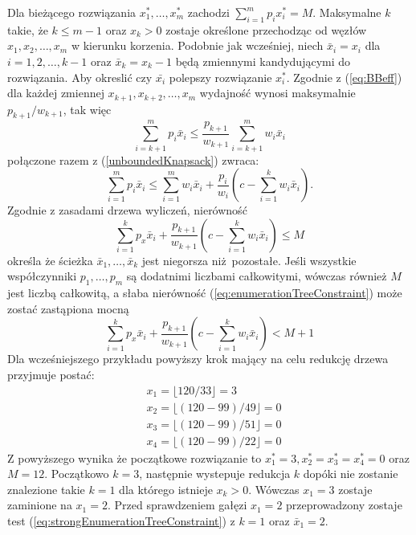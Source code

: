Dla bieżącego rozwiązania $x_1^*,\dots,x_m^*$ zachodzi $\sum_{i=1}^m p_ix_i^* = M$. Maksymalne $k$ takie, że $ k \le m - 1$ oraz $x_k > 0$ zostaje określone przechodząc od węzłów $x_1,x_2,\dots,x_m$ w kierunku korzenia. Podobnie jak wcześniej, niech $\bar{x}_i = x_i$ dla $i=1,2,\dots,k-1$ oraz $\bar{x}_k = x_k -1$ będą zmiennymi kandydującymi do rozwiązania. Aby okreslić czy $\bar{x_i}$ polepszy rozwiązanie $x_i^*$. Zgodnie z (\ref{eq:BBeff}) dla każdej zmiennej $x_{k+1}, x_{k+2}, \dots, x_m$ wydajność wynosi maksymalnie $p_{k+1}/w_{k+1}$, tak więc
\begin{equation*}
  \sum_{i=k+1}^m p_i\bar{x}_i \le \frac{p_{k+1}}{w_{k+1}}\sum_{i=k+1}^m w_i \bar{x}_i
\end{equation*}
połączone razem z (\ref{unboundedKnapsack}) zwraca:
\begin{equation}
  \sum_{i=1}^m p_i\bar{x}_i \le \sum_{i=1}^m w_i \bar{x}_i + \frac{p_i}{w_{i}}( c - \sum_{i=1}^k w_i\bar{x}_i ).
\end{equation}
Zgodnie z zasadami drzewa wyliczeń, nierówność
\begin{equation} \label{eq:enumerationTreeConstraint}
  \sum_{i=1}^k p_x\bar{x}_i + \frac{p_{k+1}}{w_{k+1}}(c - \sum_{i=1}^kw_i\bar{x}_i) \le M
\end{equation}
określa że ścieżka $\bar{x}_1, \dots, \bar{x}_k$ jest niegorsza niż pozostałe. Jeśli wszystkie współczynniki $p_1,\dots,p_m$ są dodatnimi liczbami całkowitymi, wówczas również $M$ jest liczbą całkowitą, a słaba nierówność (\ref{eq:enumerationTreeConstraint}) może zostać zastąpiona mocną
\begin{equation} \label{eq:strongEnumerationTreeConstraint}
  \sum_{i=1}^k p_x\bar{x}_i + \frac{p_{k+1}}{w_{k+1}}(c - \sum_{i=1}^kw_i\bar{x}_i) < M + 1
\end{equation}
Dla wcześniejszego przykładu powyższy krok mający na celu redukcję drzewa przyjmuje postać:
\begin{equation*}
  \begin{aligned}
    & x_1 = \lfloor120/33\rfloor = 3 \\
    & x_2 = \lfloor(120-99)/49\rfloor = 0 \\
    & x_3 = \lfloor(120-99)/51\rfloor = 0 \\
    & x_4 = \lfloor(120-99)/22\rfloor = 0
  \end{aligned}
\end{equation*}
Z powyższego wynika że początkowe rozwiązanie to $x_1^* = 3, x_2^*=x_3^*=x_4^*=0$ oraz $M = 12$. Początkowo $k=3$, następnie wystepuje redukcja $k$ dopóki nie zostanie znalezione takie $k=1$ dla którego istnieje $x_k > 0$. Wówczas $x_1=3$ zostaje zaminione na $x_1=2$. Przed sprawdzeniem gałęzi $x_1=2$ przeprowadzony zostaje test (\ref{eq:strongEnumerationTreeConstraint}) z $k=1$ oraz $\bar{x}_1 = 2$.
